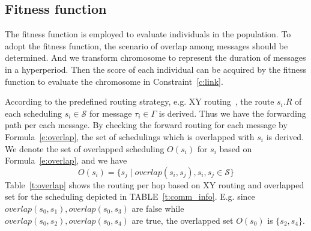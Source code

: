 \documentclass[journal]{IEEEtran}
\newcommand{\calS}{\mathcal{S}}
\theoremstyle{remark}
\begin{document}
\subsection{Fitness function \label{s:fit}}

The fitness function is employed to evaluate individuals in the population.
To adopt the fitness function, 
the scenario of overlap among messages should be determined.
And we transform chromosome to represent the duration of messages in a hyperperiod.
Then the score of each individual can be acquired by the fitness function to evaluate the chromosome in Constraint~\ref{c:link}.

According to the predefined routing strategy,
e.g. XY routing~\cite{DBLP:books/daglib/0087651},
the route $s_i.R$ of each scheduling $s_i\in \calS$ for message $\tau_i\in\Gamma$ is derived.
Thus we have the forwarding path per each message.
By checking the forward routing for each message by Formula~\ref{e:overlap},
the set of schedulings which is overlapped with $s_i$ is derived.
We denote the set of overlapped scheduling $O(s_i)$ for $s_i$ based on Formula~\ref{e:overlap},
and we have
\begin{equation}
O(s_i) = \{ s_j \mid overlap(s_i,s_j),s_i,s_j\in \calS  \}
\end{equation}
Table~\ref{t:overlap} shows the routing per hop based on XY routing and overlapped set for the scheduling depicted in TABLE~\ref{t:comm_info}.
E.g. since $overlap(s_{0},s_{1}),overlap(s_{0},s_{3})$ are false while $overlap(s_{0},s_{2}),overlap(s_{0},s_{4})$ are true, the overlapped set $O(s_{0})$ is $\{ s_{2},s_{4} \}$. 
\end{document}
